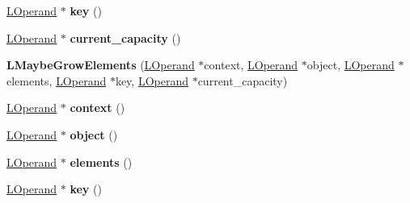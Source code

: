 \begin{DoxyCompactItemize}
\item 
\hyperlink{classv8_1_1internal_1_1_l_operand}{L\+Operand} $\ast$ {\bfseries key} ()\hypertarget{classv8_1_1internal_1_1_l_maybe_grow_elements_ac0b59ca4db13f2a31428c9b8063321dc}{}\label{classv8_1_1internal_1_1_l_maybe_grow_elements_ac0b59ca4db13f2a31428c9b8063321dc}

\item 
\hyperlink{classv8_1_1internal_1_1_l_operand}{L\+Operand} $\ast$ {\bfseries current\+\_\+capacity} ()\hypertarget{classv8_1_1internal_1_1_l_maybe_grow_elements_a8fc52ebb7ecf6d10f977d9b56cfe702d}{}\label{classv8_1_1internal_1_1_l_maybe_grow_elements_a8fc52ebb7ecf6d10f977d9b56cfe702d}

\item 
{\bfseries L\+Maybe\+Grow\+Elements} (\hyperlink{classv8_1_1internal_1_1_l_operand}{L\+Operand} $\ast$context, \hyperlink{classv8_1_1internal_1_1_l_operand}{L\+Operand} $\ast$object, \hyperlink{classv8_1_1internal_1_1_l_operand}{L\+Operand} $\ast$elements, \hyperlink{classv8_1_1internal_1_1_l_operand}{L\+Operand} $\ast$key, \hyperlink{classv8_1_1internal_1_1_l_operand}{L\+Operand} $\ast$current\+\_\+capacity)\hypertarget{classv8_1_1internal_1_1_l_maybe_grow_elements_aae48ee99b99d58f8e16bc264666c78ff}{}\label{classv8_1_1internal_1_1_l_maybe_grow_elements_aae48ee99b99d58f8e16bc264666c78ff}

\item 
\hyperlink{classv8_1_1internal_1_1_l_operand}{L\+Operand} $\ast$ {\bfseries context} ()\hypertarget{classv8_1_1internal_1_1_l_maybe_grow_elements_a6af5b70c66f542bb308ac9ada8cb6372}{}\label{classv8_1_1internal_1_1_l_maybe_grow_elements_a6af5b70c66f542bb308ac9ada8cb6372}

\item 
\hyperlink{classv8_1_1internal_1_1_l_operand}{L\+Operand} $\ast$ {\bfseries object} ()\hypertarget{classv8_1_1internal_1_1_l_maybe_grow_elements_a557ff494aa6f7b9a2a5f218005419b34}{}\label{classv8_1_1internal_1_1_l_maybe_grow_elements_a557ff494aa6f7b9a2a5f218005419b34}

\item 
\hyperlink{classv8_1_1internal_1_1_l_operand}{L\+Operand} $\ast$ {\bfseries elements} ()\hypertarget{classv8_1_1internal_1_1_l_maybe_grow_elements_aa58e07c5ac443be8021a0a6dbfe237cb}{}\label{classv8_1_1internal_1_1_l_maybe_grow_elements_aa58e07c5ac443be8021a0a6dbfe237cb}

\item 
\hyperlink{classv8_1_1internal_1_1_l_operand}{L\+Operand} $\ast$ {\bfseries key} ()\hypertarget{classv8_1_1internal_1_1_l_maybe_grow_elements_ac0b59ca4db13f2a31428c9b8063321dc}{}\label{classv8_1_1internal_1_1_l_maybe_grow_elements_ac0b59ca4db13f2a31428c9b8063321dc}


\end{DoxyCompactItemize}
